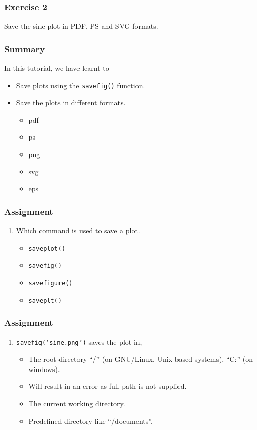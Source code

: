 \documentclass[17pt]{beamer}
\newcounter{saveenumi}
\newcommand{\seti}{\setcounter{saveenumi}{\value{enumi}}}
\newcommand{\conti}{\setcounter{enumi}{\value{saveenumi}}}
\begin{document}
\begin{frame}
\frametitle{Exercise 2}
\label{sec-8}
Save the sine plot in PDF, PS and SVG formats.
\end{frame}
\begin{frame}
\frametitle{Summary}
\label{sec-9}
In this tutorial, we have learnt to -\pause
\begin{itemize}
\item Save plots using the \texttt{savefig()} function.\pause
\item Save the plots in different formats.\pause
\begin{itemize}
\item pdf
\item ps
\item png
\item svg
\item eps
\end{itemize}
\end{itemize}
\end{frame}
\begin{frame}
\frametitle{Assignment}
\label{sec-10}
\begin{enumerate}
\item Which command is used to save a plot.\pause
	\begin{itemize}
	\item \texttt{saveplot()}\pause
	\item \texttt{savefig()}\pause
	\item \texttt{savefigure()}\pause
	\item \texttt{saveplt()}
	\end{itemize}
	\seti
\end{enumerate}
\end{frame}
\begin{frame}
\frametitle{Assignment}
\begin{enumerate}
\conti
\item \texttt{savefig('sine.png')} saves the plot in,
\begin{itemize}
\item The root directory ``/'' (on GNU/Linux, Unix based systems),
``C:'' (on windows).\pause
\item Will result in an error as full path is not supplied.\pause
\item The current working directory.\pause
\item Predefined directory like ``/documents''.
\end{itemize}
\end{enumerate}
\end{frame}
\end{document}
